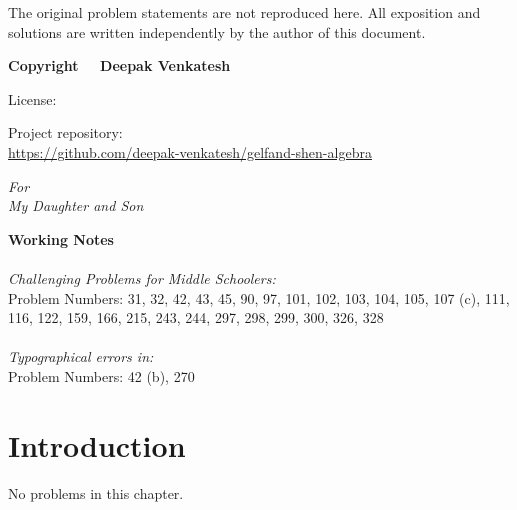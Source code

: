 \documentclass[10pt]{article}
\newcounter{problem}
\begin{document}
\vspace{0.4cm}

\noindent
The original problem statements are not reproduced here. All exposition and solutions
are written independently by the author of this document.

\vspace{1.5cm}

\noindent
\textbf{Copyright \textcopyright\ \the\year\ Deepak Venkatesh}

\vspace{1.5cm}

\noindent
License: \doclicenseThis

\vfill

\noindent
Project repository:\\
\href{https://github.com/deepak-venkatesh/gelfand-shen-algebra}{https://github.com/deepak-venkatesh/gelfand-shen-algebra}

\clearpage

\newpage
\thispagestyle{empty}

\vspace*{\fill}
\begin{center}
\textit{For\\[0.5em]
My Daughter and Son}
\end{center}
\vspace*{\fill}
\newpage
\tableofcontents
\newpage %

\textbf{Working Notes}\\\\

\emph{Challenging Problems for Middle Schoolers:}\\

Problem Numbers: 31, 32, 42, 43, 45, 90, 97, 101, 102, 103, 104, 105, 107 (c), 111, 116, 122, 159, 166, 215, 243, 244,
297, 298, 299, 300, 326, 328 \\\\

\emph{Typographical errors in:}\\

Problem Numbers: 42 (b), 270

\newpage

\section{Introduction}
No problems in this chapter.
\end{document}
